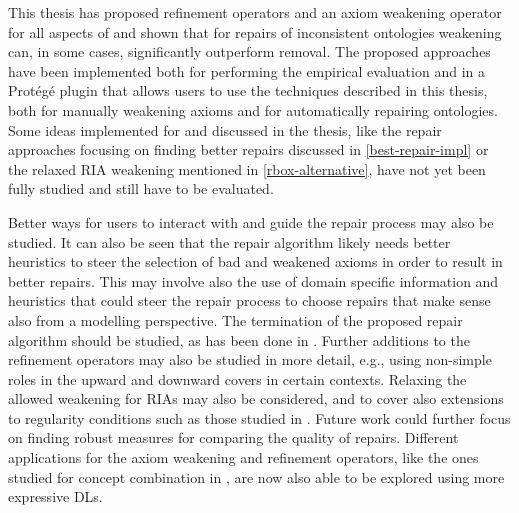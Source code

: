 
This thesis has proposed refinement operators and an axiom weakening operator for all aspects of \SROIQ and shown that for repairs of inconsistent ontologies weakening can, in some cases, significantly outperform removal. The proposed approaches have been implemented both for performing the empirical evaluation and in a Protégé plugin that allows users to use the techniques described in this thesis, both for manually weakening axioms and for automatically repairing ontologies. Some ideas implemented for and discussed in the thesis, like the repair approaches focusing on finding better repairs discussed in \cref{best-repair-impl} or the relaxed RIA weakening mentioned in \cref{rbox-alternative}, have not yet been fully studied and still have to be evaluated.

Better ways for users to interact with and guide the repair process may also be studied. It can also be seen that the repair algorithm likely needs better heuristics to steer the selection of bad and weakened axioms in order to result in better repairs. This may involve also the use of domain specific information and heuristics that could steer the repair process to choose repairs that make sense also from a modelling perspective. The termination of the proposed repair algorithm should be studied, as has been done in \cite{confalonieri2020towards}. Further additions to the refinement operators may also be studied in more detail, e.g., using non-simple roles in the upward and downward covers in certain contexts. Relaxing the allowed weakening for RIAs may also be considered, and to cover also extensions to regularity conditions such as those studied in \cite{DBLP:conf/cade/Kazakov10}. Future work could further focus on finding robust measures for comparing the quality of repairs. Different applications for the axiom weakening and refinement operators, like the ones studied for concept combination in \cite{righetti2022asymmetric}, are now also able to be explored using more expressive DLs.

